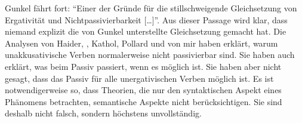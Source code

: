 Gunkel fährt fort: "`Einer der Gründe für die stillschweigende Gleichsetzung von Ergativität und
  Nichtpassivierbarkeit [\ldots]"'.
Aus dieser Passage wird klar, dass niemand explizit die von Gunkel unterstellte Gleichsetzung gemacht hat.
Die Analysen von Haider, \citeauthor{HM94a}, Kathol, Pollard und von mir haben erklärt, warum
unakkusativische Verben normalerweise nicht 
passivierbar sind. Sie haben auch erklärt, was beim Passiv passiert, wenn es möglich ist. Sie haben aber nicht gesagt,
dass das Passiv für alle unergativischen Verben möglich ist. Es ist notwendigerweise so, dass Theorien, die nur den
syntaktischen Aspekt eines Phänomens betrachten, semantische Aspekte nicht berücksichtigen. Sie sind
deshalb nicht falsch, sondern höchstens unvollständig. 

